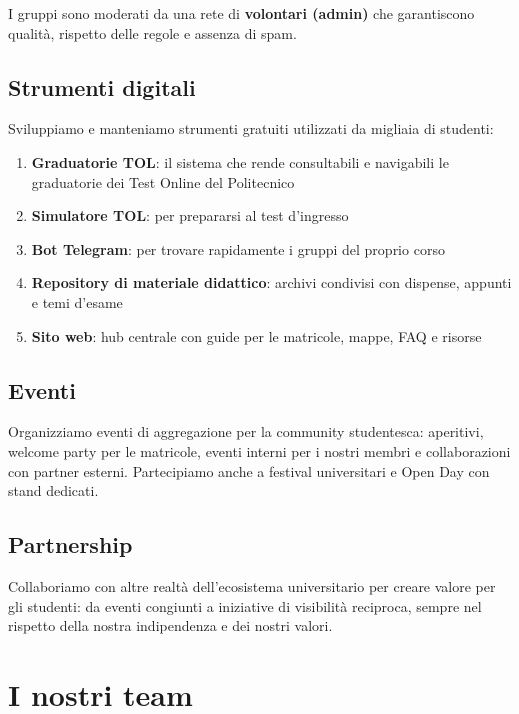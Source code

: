 \documentclass[letter]{core/polinetwork}
\begin{document}
I gruppi sono moderati da una rete di \textbf{volontari (admin)} che
garantiscono qualità, rispetto delle regole e assenza di spam.

\subsection{Strumenti digitali}

Sviluppiamo e manteniamo strumenti gratuiti utilizzati da migliaia
di studenti:

\begin{enumerate}[leftmargin=2em]
    \item \textbf{Graduatorie TOL}: il sistema che rende consultabili
          e navigabili le graduatorie dei Test Online del Politecnico
    \item \textbf{Simulatore TOL}: per prepararsi al test d'ingresso
    \item \textbf{Bot Telegram}: per trovare rapidamente i gruppi del
          proprio corso
    \item \textbf{Repository di materiale didattico}: archivi condivisi
          con dispense, appunti e temi d'esame
    \item \textbf{Sito web}: hub centrale con guide per le matricole,
          mappe, FAQ e risorse
\end{enumerate}

\subsection{Eventi}

Organizziamo eventi di aggregazione per la community studentesca:
aperitivi, welcome party per le matricole, eventi interni per i
nostri membri e collaborazioni con partner esterni. Partecipiamo
anche a festival universitari e Open Day con stand dedicati.

\subsection{Partnership}

Collaboriamo con altre realtà dell'ecosistema universitario per
creare valore per gli studenti: da eventi congiunti a iniziative
di visibilità reciproca, sempre nel rispetto della nostra
indipendenza e dei nostri valori.

\section{I nostri team}
\end{document}
